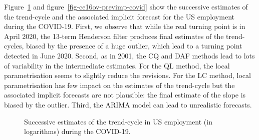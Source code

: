 \documentclass[
]{article}
\newcommand\1{\mathds{1}}
\begin{document}
Figure~\ref{fig-ce16ovcovid} and figure~\ref{fig-ce16ov-previmp-covid}
show the successive estimates of the trend-cycle and the associated
implicit forecast for the US employment during the COVID-19. First, we
observe that while the real turning point is in April 2020, the 13-term
Henderson filter produces final estimates of the trend-cycles, biased by
the presence of a huge outlier, which lead to a turning point detected
in June 2020. Second, as in 2001, the CQ and DAF methods lead to lots of
variability in the intermediate estimates. For the QL method, the local
parametrisation seems to slightly reduce the revisions. For the LC
method, local parametrisation has few impact on the estimates of the
trend-cycle but the associated implicit forecasts are not plausible: the
final estimate of the slope is biased by the outlier. Third, the ARIMA
model can lead to unrealistic forecasts.

\begin{figure}[H]

\caption{\label{fig-ce16ovcovid}Successive estimates of the trend-cycle
in US employment (in logarithms) during the COVID-19.}


\end{figure}%
\end{document}
